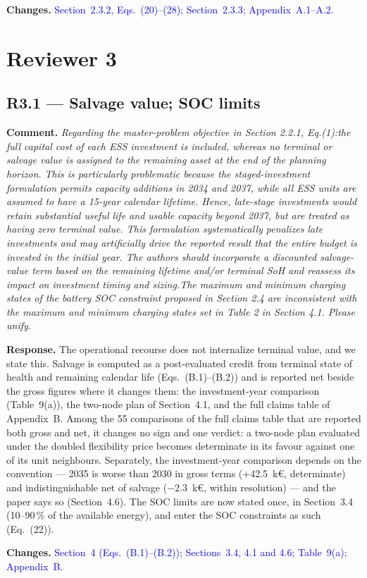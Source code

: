 \documentclass[11pt]{article}
\newcommand{\rcomment}[1]{\par\medskip\noindent\textbf{Comment.} \textit{#1}\par\smallskip}
\newcommand{\rresponse}[1]{\noindent\textbf{Response.} #1\par\smallskip}
\newcommand{\rchanges}[1]{\noindent\textbf{Changes.} \textcolor{blue}{#1}\par\medskip}
\begin{document}
\rchanges{
    Section~2.3.2, Eqs.~(20)--(28); Section~2.3.3; Appendix~A.1--A.2.
}

\section*{Reviewer 3}

\subsection*{R3.1 --- Salvage value; SOC limits}
\rcomment{
Regarding the master-problem objective in Section 2.2.1, Eq.(1):the full capital cost of each ESS investment is included, whereas no terminal or salvage value is assigned to the remaining asset at the end of the planning horizon. This is particularly problematic because the staged-investment formulation permits capacity additions in 2034 and 2037, while all ESS units are assumed to have a 15-year calendar lifetime. Hence, late-stage investments would retain substantial useful life and usable capacity beyond 2037, but are treated as having zero terminal value. This formulation systematically penalizes late investments and may artificially drive the reported result that the entire budget is invested in the initial year. The authors should incorporate a discounted salvage-value term based on the remaining lifetime and/or terminal SoH and reassess its impact on investment timing and sizing.The maximum and minimum charging states of the battery SOC constraint proposed in Section 2.4 are inconsistent with the maximum and minimum charging states set in Table 2 in Section 4.1. Please unify.
}
\rresponse{The operational recourse does not internalize terminal value, and we state this. Salvage is computed as a post-evaluated credit from terminal state of health and remaining calendar life (Eqs.~(B.1)--(B.2)) and is reported net beside the gross figures where it changes them: the investment-year comparison (Table~9(a)), the two-node plan of Section~4.1, and the full claims table of Appendix~B. 
Among the 55 comparisons of the full claims table that are reported both gross and net, it changes no sign and one verdict: a two-node plan evaluated under the doubled flexibility price becomes determinate in its favour against one of its unit neighbours. Separately, the investment-year comparison depends on the convention --- 2035 is worse than 2030 in gross terms (+42.5~k\euro{}, determinate) and indistinguishable net of salvage ($-2.3$~k\euro{}, within resolution) --- and the paper says so (Section~4.6). The SOC limits are now stated once, in Section~3.4 (10--90\,\% of the available energy), and enter the SOC constraints as such (Eq.~(22)).}
\rchanges{Section~4 (Eqs.~(B.1)--(B.2)); Sections~3.4, 4.1 and 4.6; Table~9(a); Appendix~B.}
\end{document}
